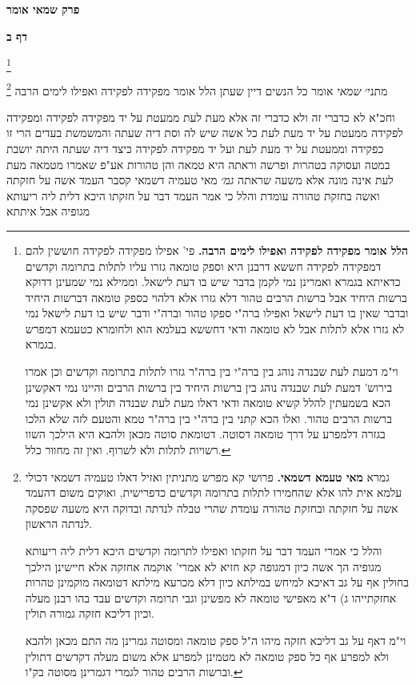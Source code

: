\documentclass[12pt, openany]{book}
\newcommand{\sethebfont}{
\fontsize{10.5pt}{21.0pt} \selectfont
}
\newcommand{\twocol}[1]{
	{\sethebfont \begin{multicols}{2}
			#1
	\end{multicols}}	
}
\newcommand{\chapname}{}
\newcommand{\sectname}{}
\newcommand{\newchap}[1]{
	\addcontentsline{toc}{chapter}{#1}
	\renewcommand{\chapname}{#1}
		\begin{center}
			\textbf{%
\fontsize{16pt}{16pt}\selectfont
				#1}
		\end{center}
}
\newcommand{\newsection}[1]{
	\addcontentsline{toc}{section}{#1}
	\renewcommand{\sectname}{#1}	
	\vspace{-\baselineskip}
	\begin{center}
		\textbf{%
\fontsize{16pt}{16pt}\selectfont
			#1}
	\end{center}
	\vspace{-\baselineskip}
	\nopagebreak
}
\newcommand{\footnotecomment}[1]{\footnote{#1}}
\newcommand{\commenta}[1]{\footnotecomment{#1}}
\begin{document}
\newchap{פרק  שמאי אומר}
\newsection{דף ב}
\twocol{
\commenta{\textbf{הלל אומר מפקידה לפקידה ואפילו לימים הרבה.}  פי' אפילו מפקידה לפקידה חוששין להם דמפקידה לפקידה חששא דרבנן היא וספק טומאה גזרו עליו לתלות בתרומה וקדשים כדאיתא בגמרא ואמרינן נמי לקמן בדבר שיש בו דעת לישאל. וממילא נמי שמעינן דדוקא ברשות היחיד אבל ברשות הרבים טהור דלא גזרו אלא דלהוי כספק טומאה דברשות היחיד ובדבר שאין בו דעת לישאל ואפילו ברה"י ספקו טהור וברה"י ודבר שיש בו דעת לישאל נמי לא גזרו אלא לתלות אבל לא טומאה ודאי דחששא בעלמא הוא ולחומרא כטעמא דמפרש בגמרא.\par וי"מ דמעת לעת שבנדה נוהג בין ברה"י בין ברה"ר גזרו לתלות בתרומה וקדשים וכן אמרו בירוש' דמעת לעת שבנדה נוהג בין ברשות היחיד בין ברשות הרבים והיינו נמי דאקשינן הכא בשמעתין להלל קשיא טומאה ודאי דאלו מעת לעת שבנדה תולין ולא אקשינן נמי ברשות הרבים טהור. ואלו הכא קתני בין ברה"י בין ברה"ר טמא והטעם לזה שלא הלכו בגזרה דלמפרע על דרך טומאה דסוטה. דטומאת סוטה מכאן ולהבא היא הילכך השוו רשויות לתלות ולא לשרוף. ואין זה מחוור כלל. }

מתני׳ {\large\emph{שמאי}} אומר כל הנשים דיין שעתן  הלל אומר  מפקידה לפקידה ואפילו לימים הרבה 
\commenta{גמרא \textbf{מאי טעמא דשמאי.}  פרושי קא מפרש מתניתין ואזיל דאלו טעמיה דשמאי דכולי עלמא אית להו אלא שהחמירו לתלות בתרומה וקדשים כדפרישית, ואוקים משום דהעמד אשה על חזקתה ובחזקת טהורה עומדת שהרי טבלה לנדתה ובדוקה היא משעה שפסקה לנדתה הראשון.\par  והלל כי אמרי העמד דבר על חזקתו ואפילו לתרומה וקדשים היכא דלית ליה ריעותא מגופיה הך אשה כיון דמגופה קא חזיא לא אמרי' אוקמה אחזקה אלא חיישינן הילכך בחולין אף על גב דאיכא למיחש במילתא כיון דלא מכרעא מילתא דטומאה מוקמינן טהרות אחזקתייהו ג) ד"א מאפישי טומאה לא מפשינן וגבי תרומה וקדשים עבד בהו רבנן מעלה וכיון דליכא חזקה גמורה תולין.\par וי"מ דאף על גב דליכא חזקה מיהו ה"ל ספק טומאה ומסוטה גמרינן מה התם מכאן ולהבא ולא למפרע אף כל ספק טומאה לא מטמינן למפרע אלא משום מעלה דקדשים דתולין וברשות הרבים טהור לגמרי דגמרינן מסוטה בק"ו. }

וחכ"א  לא כדברי זה ולא כדברי זה אלא מעת לעת ממעטת על יד מפקידה לפקידה ומפקידה לפקידה ממעטת על יד מעת לעת 
כל אשה שיש לה וסת דיה שעתה  והמשמשת בעדים הרי זו כפקידה וממעטת על יד מעת לעת ועל יד מפקידה לפקידה 
כיצד דיה שעתה  היתה יושבת במטה ועסוקה בטהרות ופרשה וראתה היא טמאה והן טהורות 
אע"פ שאמרו  מטמאה מעת לעת אינה מונה אלא משעה שראתה
{\large\emph{גמ׳}} מאי טעמיה דשמאי קסבר  העמד אשה על חזקתה ואשה בחזקת טהורה עומדת  והלל כי אמר העמד דבר על חזקתו היכא דלית ליה ריעותא מגופיה אבל איתתא}
\end{document}
